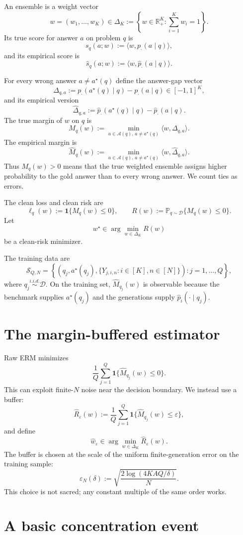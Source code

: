 \documentclass[11pt]{article}
\newcommand{\A}{\mathcal A}
\newcommand{\D}{\mathcal D}
\newcommand{\Pp}{\mathbb P}
\newcommand{\one}{\mathbf 1}
\newcommand{\what}{\widehat w}
\newcommand{\wstar}{w^\star}
\newcommand{\eps}{\varepsilon}
\begin{document}
An ensemble is a weight vector
\[
w=(w_1,\dots,w_K)\in\Delta_K
:=
\left\{w\in\mathbb R_+^K:\sum_{i=1}^K w_i=1\right\}.
\]
Its true score for answer $a$ on problem $q$ is
\[
s_q(a;w):=\langle w,p_\cdot(a\mid q)\rangle,
\]
and its empirical score is
\[
\widehat s_q(a;w):=\langle w,\widehat p_\cdot(a\mid q)\rangle.
\]

For every wrong answer $a\ne a^\star(q)$ define the answer-gap vector
\[
\Delta_{q,a}
:=
p_\cdot(a^\star(q)\mid q)-p_\cdot(a\mid q)\in[-1,1]^K,
\]
and its empirical version
\[
\widehat\Delta_{q,a}
:=
\widehat p_\cdot(a^\star(q)\mid q)-\widehat p_\cdot(a\mid q).
\]
The true margin of $w$ on $q$ is
\[
M_q(w)
:=
\min_{a\in\A(q),\,a\ne a^\star(q)}
\langle w,\Delta_{q,a}\rangle.
\]
The empirical margin is
\[
\widehat M_q(w)
:=
\min_{a\in\A(q),\,a\ne a^\star(q)}
\langle w,\widehat\Delta_{q,a}\rangle.
\]
Thus $M_q(w)>0$ means that the true weighted ensemble assigns higher probability to the gold answer than to every wrong answer.  We count ties as errors.

The clean loss and clean risk are
\[
\ell_q(w):=\one\{M_q(w)\le 0\},
\qquad
R(w):=\Pp_{q\sim\D}\{M_q(w)\le 0\}.
\]
Let
\[
\wstar\in\arg\min_{w\in\Delta_K} R(w)
\]
be a clean-risk minimizer.

The training data are
\[
\mathcal S_{Q,N}
=
\left\{\left(q_j,a^\star(q_j),\{Y_{j,i,n}:i\in[K],n\in[N]\}\right):j=1,\dots,Q\right\},
\]
where $q_j\overset{i.i.d.}{\sim}\D$.  On the training set, $\widehat M_{q_j}(w)$ is observable because the benchmark supplies $a^\star(q_j)$ and the generations supply $\widehat p_i(\cdot\mid q_j)$.

\section{The margin-buffered estimator}

Raw ERM minimizes
\[
\frac1Q\sum_{j=1}^Q \one\{\widehat M_{q_j}(w)\le 0\}.
\]
This can exploit finite-$N$ noise near the decision boundary.  We instead use a buffer:
\[
\widehat R_\eps(w)
:=
\frac1Q\sum_{j=1}^Q \one\{\widehat M_{q_j}(w)\le \eps\},
\]
and define
\[
\what_\eps\in\arg\min_{w\in\Delta_K}\widehat R_\eps(w).
\]
The buffer is chosen at the scale of the uniform finite-generation error on the training sample:
\[
\eps_N(\delta)
:=
\sqrt{\frac{2\log(4KAQ/\delta)}{N}}.
\]
This choice is not sacred; any constant multiple of the same order works.

\section{A basic concentration event}
\end{document}
